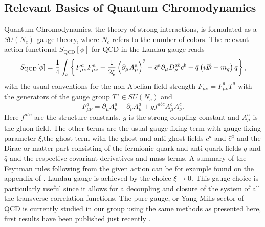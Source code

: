 \subsection{Relevant Basics of Quantum Chromodynamics}
Quantum Chromodynamics, the theory of strong interactions, is formulated as a $SU(N_c)$ gauge theory, where $N_c$ refers to the number of colors.
The relevant action functional $S_{\mathrm{QCD}}[\phi]$ for QCD in the Landau gauge reads
\begin{equation}
S_{\mathrm{QCD}}[\phi]=\frac{1}{4} \int_{x}\left\{F_{\mu \nu}^{a} F_{\mu \nu}^{a}+\frac{1}{2 \xi}\left(\partial_{\mu} A_{\mu}^{a}\right)^{2}-\bar{c}^{a} \partial_{\mu} D_{\mu}^{a b} c^{b}+\bar{q}\left(i\slashed{D}+m_{q}\right) q\right\},
\label{eqn:S_QCD}
\end{equation}
with the usual conventions for the non-Abelian field strength $F_{\mu\nu} = F_{\mu\nu}^{a}T^{a}$ with the generators of the gauge group  $T^{a} \in SU(N_c)$ and 
\begin{equation}
	F_{\mu \nu}^{a}=\partial_{\mu} A_{\nu}^{a}-\partial_{\nu} A_{\mu}^{a}+g f^{a b c} A_{\mu}^{b} A_{\nu}^{c}.
\end{equation}
Here $f^{abc}$ are the structure constants, $g$ is the strong coupling constant and  $A_{\mu}^{a}$ is the gluon field. The other terms are the usual gauge fixing term with gauge fixing parameter $\xi$,the ghost term with the ghost and anti-ghost fields $c^{a}$ and $\bar{c}^{a}$ and the Dirac or matter part consisting of the fermionic quark and anti-quark fields $q$ and $\bar{q}$ and the respective covariant derivatives and mass terms. A summary of the Feynman rules following from the given action can be for example found on the appendix of \cite{NPgaugeLecture}.
Landau gauge is achieved by the choice $\xi\rightarrow 0$. This gauge choice is particularly useful since it   allows for a decoupling and closure of the system of all the transverse correlation functions. The pure gauge, or Yang-Mills sector of QCD is currently studied in our group using the same methods as presented here, first results have been published just recently \cite{HorakPapavassiliouPawlowskiWink2021}.
